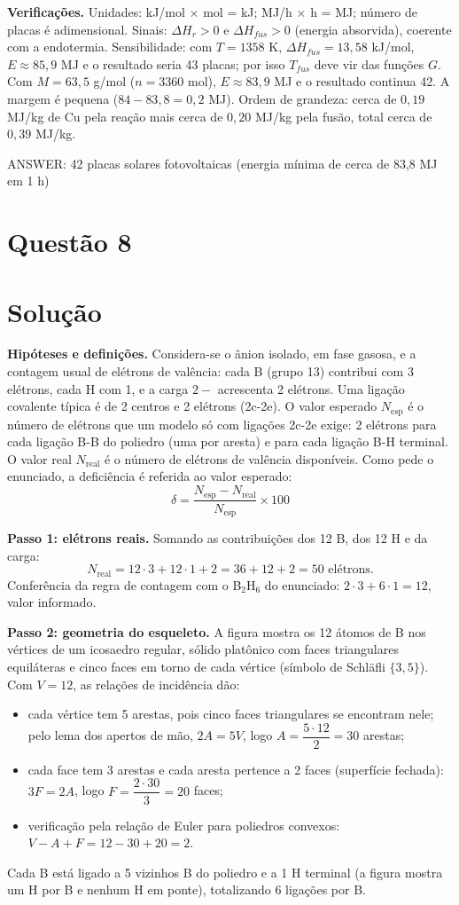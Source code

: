 \documentclass{article}%
\begin{document}
\textbf{Verificações.} Unidades: kJ/mol $\times$ mol = kJ; MJ/h $\times$ h = MJ; número de placas é adimensional. Sinais: $\Delta H_r>0$ e $\Delta H_{fus}>0$ (energia absorvida), coerente com a endotermia. Sensibilidade: com $T=1358$ K, $\Delta H_{fus}=13{,}58$ kJ/mol, $E\approx85{,}9$ MJ e o resultado seria 43 placas; por isso $T_{fus}$ deve vir das funções $G$. Com $M=63{,}5$ g/mol ($n=3360$ mol), $E\approx83{,}9$ MJ e o resultado continua 42. A margem é pequena ($84-83{,}8=0{,}2$ MJ). Ordem de grandeza: cerca de $0{,}19$ MJ/kg de Cu pela reação mais cerca de $0{,}20$ MJ/kg pela fusão, total cerca de $0{,}39$ MJ/kg.

ANSWER: 42 placas solares fotovoltaicas (energia mínima de cerca de 83,8 MJ em 1 h)%
\newpage%
\section*{Questão 8}

\section*{Solução}

\textbf{Hipóteses e definições.} Considera-se o ânion isolado, em fase gasosa, e a contagem usual de elétrons de valência: cada B (grupo 13) contribui com 3 elétrons, cada H com 1, e a carga $2-$ acrescenta 2 elétrons. Uma ligação covalente típica é de 2 centros e 2 elétrons (2c-2e). O valor esperado $N_{\text{esp}}$ é o número de elétrons que um modelo só com ligações 2c-2e exige: 2 elétrons para cada ligação B-B do poliedro (uma por aresta) e para cada ligação B-H terminal. O valor real $N_{\text{real}}$ é o número de elétrons de valência disponíveis. Como pede o enunciado, a deficiência é referida ao valor esperado:
\[
\delta = \frac{N_{\text{esp}}-N_{\text{real}}}{N_{\text{esp}}}\times 100
\]

\textbf{Passo 1: elétrons reais.} Somando as contribuições dos 12 B, dos 12 H e da carga:
\[
N_{\text{real}} = 12\cdot 3 + 12\cdot 1 + 2 = 36 + 12 + 2 = 50 \text{ elétrons}.
\]
Conferência da regra de contagem com o B$_2$H$_6$ do enunciado: $2\cdot 3 + 6\cdot 1 = 12$, valor informado.

\textbf{Passo 2: geometria do esqueleto.} A figura mostra os 12 átomos de B nos vértices de um icosaedro regular, sólido platônico com faces triangulares equiláteras e cinco faces em torno de cada vértice (símbolo de Schläfli $\{3,5\}$). Com $V = 12$, as relações de incidência dão:
\begin{itemize}
\item cada vértice tem 5 arestas, pois cinco faces triangulares se encontram nele; pelo lema dos apertos de mão, $2A = 5V$, logo $A = \dfrac{5\cdot 12}{2} = 30$ arestas;
\item cada face tem 3 arestas e cada aresta pertence a 2 faces (superfície fechada): $3F = 2A$, logo $F = \dfrac{2\cdot 30}{3} = 20$ faces;
\item verificação pela relação de Euler para poliedros convexos: $V - A + F = 12 - 30 + 20 = 2$.
\end{itemize}
Cada B está ligado a 5 vizinhos B do poliedro e a 1 H terminal (a figura mostra um H por B e nenhum H em ponte), totalizando 6 ligações por B.
\end{document}
